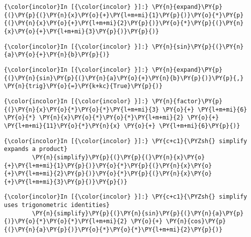     \begin{Verbatim}[commandchars=\\\{\}]
{\color{incolor}In [{\color{incolor} }]:} \PY{n}{expand}\PY{p}{(}\PY{p}{(}\PY{n}{x}\PY{o}{+}\PY{l+m+mi}{1}\PY{p}{)}\PY{o}{*}\PY{p}{(}\PY{n}{x}\PY{o}{+}\PY{l+m+mi}{2}\PY{p}{)}\PY{o}{*}\PY{p}{(}\PY{n}{x}\PY{o}{+}\PY{l+m+mi}{3}\PY{p}{)}\PY{p}{)}
\end{Verbatim}



    \begin{Verbatim}[commandchars=\\\{\}]
{\color{incolor}In [{\color{incolor} }]:} \PY{n}{sin}\PY{p}{(}\PY{n}{a}\PY{o}{+}\PY{n}{b}\PY{p}{)}
\end{Verbatim}

    \begin{Verbatim}[commandchars=\\\{\}]
{\color{incolor}In [{\color{incolor} }]:} \PY{n}{expand}\PY{p}{(}\PY{n}{sin}\PY{p}{(}\PY{n}{a}\PY{o}{+}\PY{n}{b}\PY{p}{)}\PY{p}{,} \PY{n}{trig}\PY{o}{=}\PY{k+kc}{True}\PY{p}{)}
\end{Verbatim}





    \begin{Verbatim}[commandchars=\\\{\}]
{\color{incolor}In [{\color{incolor} }]:} \PY{n}{factor}\PY{p}{(}\PY{n}{x}\PY{o}{*}\PY{o}{*}\PY{l+m+mi}{3} \PY{o}{+} \PY{l+m+mi}{6} \PY{o}{*} \PY{n}{x}\PY{o}{*}\PY{o}{*}\PY{l+m+mi}{2} \PY{o}{+} \PY{l+m+mi}{11}\PY{o}{*}\PY{n}{x} \PY{o}{+} \PY{l+m+mi}{6}\PY{p}{)}
\end{Verbatim}





    \begin{Verbatim}[commandchars=\\\{\}]
{\color{incolor}In [{\color{incolor} }]:} \PY{c+c1}{\PYZsh{} simplify expands a product}
        \PY{n}{simplify}\PY{p}{(}\PY{p}{(}\PY{n}{x}\PY{o}{+}\PY{l+m+mi}{1}\PY{p}{)}\PY{o}{*}\PY{p}{(}\PY{n}{x}\PY{o}{+}\PY{l+m+mi}{2}\PY{p}{)}\PY{o}{*}\PY{p}{(}\PY{n}{x}\PY{o}{+}\PY{l+m+mi}{3}\PY{p}{)}\PY{p}{)}
\end{Verbatim}

    \begin{Verbatim}[commandchars=\\\{\}]
{\color{incolor}In [{\color{incolor} }]:} \PY{c+c1}{\PYZsh{} simplify uses trigonometric identities}
        \PY{n}{simplify}\PY{p}{(}\PY{n}{sin}\PY{p}{(}\PY{n}{a}\PY{p}{)}\PY{o}{*}\PY{o}{*}\PY{l+m+mi}{2} \PY{o}{+} \PY{n}{cos}\PY{p}{(}\PY{n}{a}\PY{p}{)}\PY{o}{*}\PY{o}{*}\PY{l+m+mi}{2}\PY{p}{)}
\end{Verbatim}

